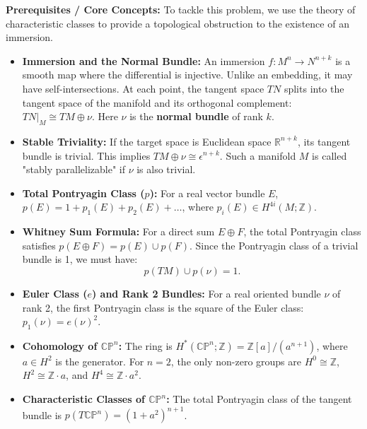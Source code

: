 \begin{solution}
\textbf{Prerequisites / Core Concepts:}
To tackle this problem, we use the theory of characteristic classes to provide a topological obstruction to the existence of an immersion.
\begin{itemize}
    \item \textbf{Immersion and the Normal Bundle:} 
    An immersion $f: M^n \to N^{n+k}$ is a smooth map where the differential is injective. Unlike an embedding, it may have self-intersections. At each point, the tangent space $TN$ splits into the tangent space of the manifold and its orthogonal complement: $TN|_M \cong TM \oplus \nu$. Here $\nu$ is the \textbf{normal bundle} of rank $k$.
    \item \textbf{Stable Triviality:} 
    If the target space is Euclidean space $\mathbb{R}^{n+k}$, its tangent bundle is trivial. This implies $TM \oplus \nu \cong \epsilon^{n+k}$. Such a manifold $M$ is called "stably parallelizable" if $\nu$ is also trivial.
    \item \textbf{Total Pontryagin Class ($p$):} 
    For a real vector bundle $E$, $p(E) = 1 + p_1(E) + p_2(E) + \dots$, where $p_i(E) \in H^{4i}(M; \mathbb{Z})$. 
    \item \textbf{Whitney Sum Formula:} 
    For a direct sum $E \oplus F$, the total Pontryagin class satisfies $p(E \oplus F) = p(E) \cup p(F)$. Since the Pontryagin class of a trivial bundle is 1, we must have:
    \[ p(TM) \cup p(\nu) = 1. \]
    \item \textbf{Euler Class ($e$) and Rank 2 Bundles:} 
    For a real oriented bundle $\nu$ of rank 2, the first Pontryagin class is the square of the Euler class: $p_1(\nu) = e(\nu)^2$. 
    \item \textbf{Cohomology of $\mathbb{CP}^n$:} 
    The ring is $H^*(\mathbb{CP}^n; \mathbb{Z}) = \mathbb{Z}[a]/(a^{n+1})$, where $a \in H^2$ is the generator. For $n=2$, the only non-zero groups are $H^0 \cong \mathbb{Z}$, $H^2 \cong \mathbb{Z} \cdot a$, and $H^4 \cong \mathbb{Z} \cdot a^2$.
    \item \textbf{Characteristic Classes of $\mathbb{CP}^n$:} 
    The total Pontryagin class of the tangent bundle is $p(T\mathbb{CP}^n) = (1 + a^2)^{n+1}$.
\end{itemize}


\end{solution}
